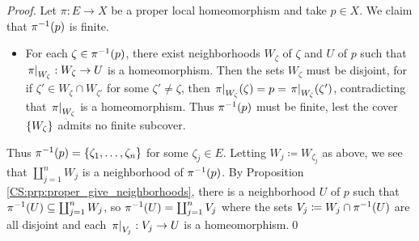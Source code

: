 \documentclass[../Moduli_Spaces_of_Riemann_Surfaces.tex]{subfiles}
\begin{document}
    \begin{proof}
        Let $\pi:E\to X$ be a proper local homeomorphism and take $p\in X$. We claim that $\pi^{-1}\!\left(p\right)$ is finite.
        \begin{itemize}
            \item For each $\zeta\in\pi^{-1}\!\left(p\right)$, there exist neighborhoods $W_\zeta$ of $\zeta$ and $U$ of $p$ such that $\left.\pi\right|_{W_\zeta}:W_\zeta\to U$ is a homeomorphism. Then the sets $W_\zeta$ must be disjoint, for if $\zeta'\in W_\zeta\cap W_{\zeta'}$ for some $\zeta'\neq\zeta$, then $\left.\pi\right|_{W_\zeta}\!\left(\zeta\right)=p=\left.\pi\right|_{W_\zeta}\!\left(\zeta'\right)$, contradicting that $\left.\pi\right|_{W_\zeta}$ is a homeomorphism. Thus $\pi^{-1}\!\left(p\right)$ must be finite, lest the cover $\left\{W_\zeta\right\}$ admits no finite subcover.
        \end{itemize}
        Thus $\pi^{-1}\!\left(p\right)=\left\{\zeta_1,\dots,\zeta_n\right\}$ for some $\zeta_j\in E$. Letting $W_j\coloneqq W_{\zeta_j}$ as above, we see that $\coprod_{j=1}^{n}W_j$ is a neighborhood of $\pi^{-1}\!\left(p\right)$. By Proposition \ref{CS:prp:proper_give_neighborhoods}, there is a neighborhood $U$ of $p$ such that $\pi^{-1}\!\left(U\right)\subseteq\coprod_{j=1}^{n}W_j$, so $\pi^{-1}\!\left(U\right)=\coprod_{j=1}^{n}V_j$ where the sets $V_j\coloneqq W_j\cap\pi^{-1}\!\left(U\right)$ are all disjoint and each $\left.\pi\right|_{V_j}:V_j\to U$ is a homeomorphism.\qed
    \end{proof}
\end{document}
